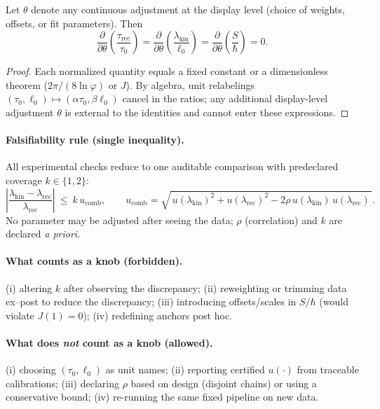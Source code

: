 \documentclass[11pt]{article}
\theoremstyle{plain}
\theoremstyle{definition}
\theoremstyle{remark}
\begin{document}
\begin{lemma}
Let \(\theta\) denote any continuous adjustment at the display level (choice of weights, offsets, or fit parameters). Then
\[
\frac{\partial}{\partial\theta}\left(\frac{\tau_{\mathrm{rec}}}{\tau_{0}}\right)
=
\frac{\partial}{\partial\theta}\left(\frac{\lambda_{\mathrm{kin}}}{\ell_{0}}\right)
=
\frac{\partial}{\partial\theta}\left(\frac{S}{\hbar}\right)
=0.
\]
\end{lemma}

\begin{proof}
Each normalized quantity equals a fixed constant or a dimensionless theorem (\(2\pi/(8\ln\varphi)\) or \(J\)). By algebra, unit relabelings \((\tau_{0},\ell_{0})\mapsto(\alpha\tau_{0},\beta\ell_{0})\) cancel in the ratios; any additional display-level adjustment \(\theta\) is external to the identities and cannot enter these expressions.
\end{proof}

\paragraph{Falsifiability rule (single inequality).}
All experimental checks reduce to one auditable comparison with predeclared coverage \(k\in\{1,2\}\):
\[
\left|\frac{\lambda_{\mathrm{kin}}-\lambda_{\mathrm{rec}}}{\lambda_{\mathrm{rec}}}\right|
\ \le\ 
k\,u_{\mathrm{comb}},
\qquad
u_{\mathrm{comb}}=\sqrt{\,u(\lambda_{\mathrm{kin}})^{2}+u(\lambda_{\mathrm{rec}})^{2}-2\rho\,u(\lambda_{\mathrm{kin}})\,u(\lambda_{\mathrm{rec}})\,}.
\]
No parameter may be adjusted after seeing the data; \(\rho\) (correlation) and \(k\) are declared \emph{a priori}.

\paragraph{What counts as a knob (forbidden).}
(i) altering \(k\) after observing the discrepancy; (ii) reweighting or trimming data ex–post to reduce the discrepancy; (iii) introducing offsets/scales in \(S/\hbar\) (would violate \(J(1)=0\)); (iv) redefining anchors post hoc.

\paragraph{What does \emph{not} count as a knob (allowed).}
(i) choosing \((\tau_{0},\ell_{0})\) as unit names; (ii) reporting certified \(u(\cdot)\) from traceable calibrations; (iii) declaring \(\rho\) based on design (disjoint chains) or using a conservative bound; (iv) re-running the same fixed pipeline on new data.
\end{document}
